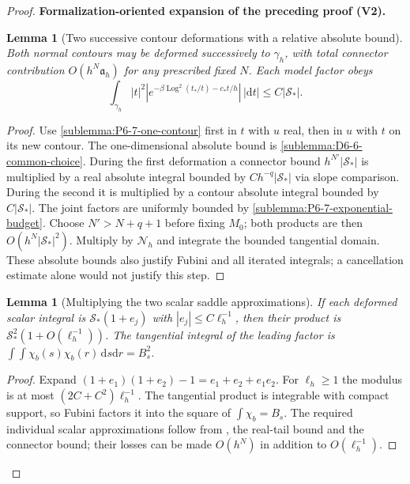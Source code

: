 \documentclass[11pt]{article}
\newtheorem{lemma}[theorem]{Lemma}
\newcommand{\formalisationparentid}{X}
\newenvironment{formalisationaddition}[1]{\par\medskip\begingroup\color{blue}\def\formalisationparentid{#1}\setcounter{formalizationsublemma}{0}\let\lemma\formalizationsublemma\let\endlemma\endformalizationsublemma
  \def\Eo{\mathcal E_h^\circ}\def\EE{\mathcal E_h}\def\phio{\phi_h^\circ}\def\phih{\phi_h}\def\Ho{H_h^{\rm atom}(v^\circ)}\def\Ha{H_h^{\rm atom}}\def\HL{H_h^{L}}\def\Dh{D_h}\def\Log{\operatorname{Log}}\def\ellh{\ell_h}\def\Gp{G_{p,h}}\def\Ast{A_{*,h}}\def\ahat{\widehat{\mathfrak a}_h}\def\ah{\mathfrak a_h}\def\rh{\widehat\rho_h}\def\deltah{\widehat\delta_h}\def\oldref##1{\textup{(##1)}}\def\interface##1{\par\noindent\textit{Analytical interface used here.} ##1\par}\def\finish{\par\noindent\textit{Conclusion of the formalization-oriented expansion.} }\par\noindent\textbf{Formalization-oriented expansion of the preceding proof (V2).}\par\smallskip
}{\par\endgroup\medskip
}
\begin{document}
\begin{proof}
\begin{formalisationaddition}{P6.7}
\begin{lemma}[Two successive contour deformations with a relative absolute bound]\label{sublemma:P6-7-product-contour}
Both normal contours may be deformed successively to $\gamma_h$,
with total connector contribution $O(h^N\mathfrak a_h)$ for any
prescribed fixed $N$. Each model factor obeys
\[
 \int_{\gamma_h}|t|^2|e^{-\beta\Log^2(t_*/t)-c_*t/h}|\,|\mathrm dt|
                    \le C|\mathcal S_*|.
\]
\end{lemma}
\begin{proof}
Use \ref{sublemma:P6-7-one-contour} first in $t$ with $u$ real,
then in $u$ with $t$ on its new contour.
The one-dimensional absolute bound is
\ref{sublemma:D6-6-common-choice}. During the first deformation a
connector bound $h^{N'}|\mathcal S_*|$ is multiplied by a real absolute
integral bounded by $Ch^{-q}|\mathcal S_*|$ via slope comparison.
During the second it is multiplied by a contour absolute integral
bounded by $C|\mathcal S_*|$. The joint factors are uniformly bounded
by \ref{sublemma:P6-7-exponential-budget}.
Choose $N'>N+q+1$ before fixing $M_0$; both products are then
$O(h^N|\mathcal S_*|^2)$.
Multiply by $\mathcal N_h$ and integrate the bounded tangential domain.
These absolute bounds also justify Fubini and all iterated integrals;
a cancellation estimate alone would not justify this step.
\end{proof}

\begin{lemma}[Multiplying the two scalar saddle approximations]\label{sublemma:P6-7-scalar-product}
If each deformed scalar integral is
$\mathcal S_*(1+e_j)$ with $|e_j|\le C\ell_h^{-1}$, then their product
is $\mathcal S_*^2(1+O(\ell_h^{-1}))$.
The tangential integral of the leading factor is
$\int\!\int\chi_b(s)\chi_b(r)\,\mathrm ds\mathrm dr=B_s^2$.
\end{lemma}
\begin{proof}
Expand $(1+e_1)(1+e_2)-1=e_1+e_2+e_1e_2$.
For $\ell_h\ge1$ the modulus is at most
$(2C+C^2)\ell_h^{-1}$.
The tangential product is integrable with compact support, so Fubini
factors it into the square of $\int\chi_b=B_s$.
The required individual scalar approximations follow from
, the real-tail bound and the
connector bound; their losses can be made $O(h^N)$ in addition to
$O(\ell_h^{-1})$.
\end{proof}


\end{formalisationaddition}
\end{proof}
\end{document}
